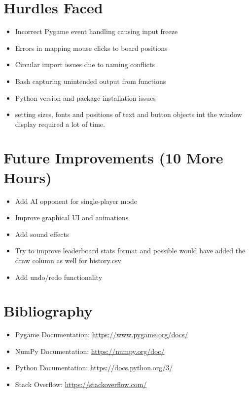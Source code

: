 \documentclass[12pt]{article}
\begin{document}
\section{Hurdles Faced}

\begin{itemize}
    \item Incorrect Pygame event handling causing input freeze
    \item Errors in mapping mouse clicks to board positions
    \item Circular import issues due to naming conflicts
    \item Bash capturing unintended output from functions
    \item Python version and package installation issues
	\item setting sizes, fonts and positions of text and button objects int the window display required a lot of time. 
\end{itemize}

\section{Future Improvements (10 More Hours)}

\begin{itemize}
    \item Add AI opponent for single-player mode
    \item Improve graphical UI and animations
    \item Add sound effects
    \item Try to improve leaderboard stats format and possible would have added the draw column as well for history.csv 
    \item Add undo/redo functionality
\end{itemize}

\section{Bibliography}

\begin{itemize}
    \item Pygame Documentation: \url{https://www.pygame.org/docs/}
    \item NumPy Documentation: \url{https://numpy.org/doc/}
    \item Python Documentation: \url{https://docs.python.org/3/}
    \item Stack Overflow: \url{https://stackoverflow.com/}
\end{itemize}
\end{document}
